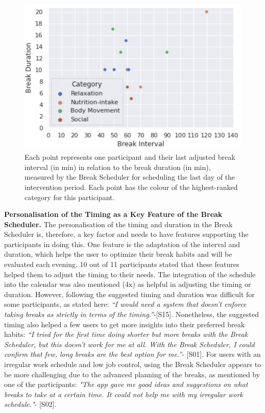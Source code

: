 \documentclass{hasel_thesis}
\begin{document}
\begin{figure}[htp]
    \centering
    \includegraphics[width=12cm]{hasel_thesis/images/duration_category.png}
    \caption{Each point represents one participant and their last adjusted break interval (in min) in relation to the break duration (in min), measured by the Break Scheduler for scheduling the last day of the intervention period. Each point has the colour of the highest-ranked category for this participant.}
    \label{fig:category_duration}
\end{figure}

\textbf{Personalisation of the Timing as a Key Feature of the Break Scheduler.}
The personalisation of the timing and duration in the Break Scheduler is, therefore, a key factor and needs to have features supporting the participants in doing this. One feature is the adaptation of the interval and duration, which helps the user to optimize their break habits and will be evaluated each evening. 10 out of 11 participants stated that these features helped them to adjust the timing to their needs. The integration of the schedule into the calendar was also mentioned (4x) as helpful in adjusting the timing or duration. However, following the suggested timing and duration was difficult for some participants, as stated here: \textit{“I would need a system that doesn't enforce taking breaks as strictly in terms of the timing.”}-[S15]. Nonetheless, the suggested timing also helped a few users to get more insights into their preferred break habits: \textit{“I tried for the first time doing shorter but more breaks with the Break Scheduler, but this doesn't work for me at all. With the Break Scheduler, I could confirm that few, long breaks are the best option for me.”}- [S01]. For users with an irregular work schedule and low job control, using the Break Scheduler appears to be more challenging due to the advanced planning of the breaks, as mentioned by one of the participants: \textit{"The app gave me good ideas and suggestions on what breaks to take at a certain time. It could not help me with my irregular work schedule."}- [S02]. 
\end{document}
